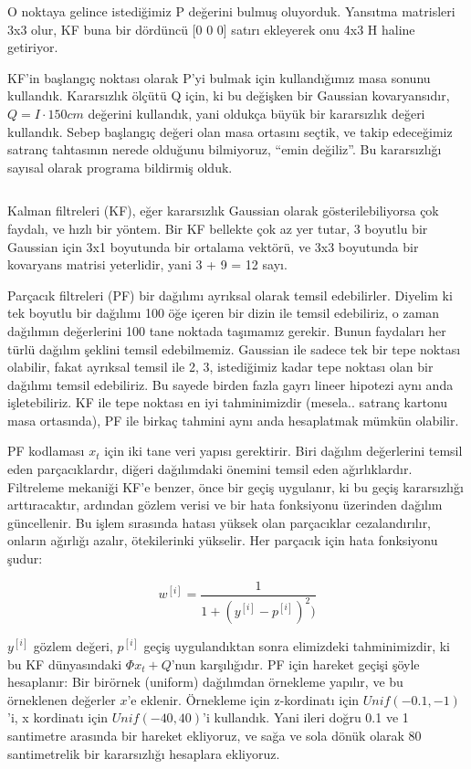 \documentclass[12pt,fleqn]{article}\usepackage{../../common}
\begin{document}
\inputminted[fontsize=\footnotesize]{python}{util.py}

O noktaya gelince istediğimiz P değerini bulmuş oluyorduk. Yansıtma
matrisleri 3x3 olur, KF buna bir dördüncü [0 0 0] satırı ekleyerek onu 4x3
H haline getiriyor.

KF'in başlangıç noktası olarak P'yi bulmak için kullandığımız masa sonunu
kullandık. Kararsızlık ölçütü Q için, ki bu değişken bir Gaussian
kovaryansıdır, $Q = I \cdot 150 cm$ değerini kullandık, yani oldukça büyük bir
kararsızlık değeri kullandık. Sebep başlangıç değeri olan masa ortasını
seçtik, ve takip edeceğimiz satranç tahtasının nerede olduğunu bilmiyoruz,
``emin değiliz''.  Bu kararsızlığı sayısal olarak programa bildirmiş olduk.

\inputminted[fontsize=\footnotesize]{python}{track-chess-kf.py}

Kalman filtreleri (KF), eğer kararsızlık Gaussian olarak gösterilebiliyorsa çok
faydalı, ve hızlı bir yöntem. Bir KF bellekte çok az yer tutar, 3 boyutlu bir
Gaussian için 3x1 boyutunda bir ortalama vektörü, ve 3x3 boyutunda bir kovaryans
matrisi yeterlidir, yani 3 + 9 = 12 sayı.

Parçacık filtreleri (PF) bir dağılımı ayrıksal olarak temsil
edebilirler. Diyelim ki tek boyutlu bir dağılımı 100 öğe içeren bir dizin ile
temsil edebiliriz, o zaman dağılımın değerlerini 100 tane noktada taşımamız
gerekir.  Bunun faydaları her türlü dağılım şeklini temsil edebilmemiz. Gaussian
ile sadece tek bir tepe noktası olabilir, fakat ayrıksal temsil ile 2, 3,
istediğimiz kadar tepe noktası olan bir dağılımı temsil edebiliriz. Bu sayede
birden fazla gayrı lineer hipotezi aynı anda işletebiliriz. KF ile tepe noktası
en iyi tahminimizdir (mesela.. satranç kartonu masa ortasında), PF ile birkaç
tahmini aynı anda hesaplatmak mümkün olabilir.

PF kodlaması $x_t$ için iki tane veri yapısı gerektirir. Biri dağılım
değerlerini temsil eden parçacıklardır, diğeri dağılımdaki önemini temsil eden
ağırlıklardır.  Filtreleme mekaniği KF'e benzer, önce bir geçiş uygulanır, ki bu
geçiş kararsızlığı arttıracaktır, ardından gözlem verisi ve bir hata fonksiyonu
üzerinden dağılım güncellenir. Bu işlem sırasında hatası yüksek olan parçacıklar
cezalandırılır, onların ağırlığı azalır, ötekilerinki yükselir. Her parçacık
için hata fonksiyonu şudur:

$$
w^{[i]} = \frac{1}{1 + (y^{[i]} - p^{[i]})^2  )}
$$

$y^{[i]}$ gözlem değeri, $p^{[i]}$ geçiş uygulandıktan sonra elimizdeki
tahminimizdir, ki bu KF dünyasındaki $\Phi x_t + Q$'nun karşılığıdır. PF için
hareket geçişi şöyle hesaplanır: Bir birörnek (uniform) dağılımdan örnekleme
yapılır, ve bu örneklenen değerler $x$'e eklenir. Örnekleme için z-kordinatı
için $Unif (-0.1, -1)$'i, x kordinatı için $Unif (-40, 40)$'i kullandık. Yani
ileri doğru 0.1 ve 1 santimetre arasında bir hareket ekliyoruz, ve sağa ve sola
dönük olarak 80 santimetrelik bir kararsızlığı hesaplara ekliyoruz.
\end{document}
